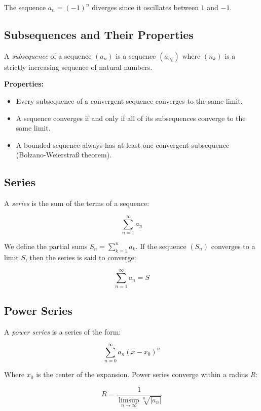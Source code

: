 The sequence \(a_n = {(-1)}^n\) diverges since it oscillates between \(1\) and \(-1\).

\subsection{Subsequences and Their Properties}

A \emph{subsequence} of a sequence \((a_n)\) is a sequence \((a_{n_k})\) where \((n_k)\) is a strictly 
increasing sequence of natural numbers.

\textbf{Properties:}

\begin{itemize}

    \item Every subsequence of a convergent sequence converges to the same limit.

    \item A sequence converges if and only if all of its subsequences converge to the same limit.

    \item A bounded sequence always has at least one convergent subsequence (Bolzano-Weierstraß theorem).

\end{itemize}

\subsection{Series}

A \emph{series} is the sum of the terms of a sequence:

\[
    \sum_{n=1}^{\infty} a_n
\]

We define the partial sums \(S_n = \sum_{k=1}^n a_k\). If the sequence \((S_n)\) converges to a limit \(S\), then the series is said to converge:

\[
    \sum_{n=1}^{\infty} a_n = S
\]

\subsection{Power Series}

A \emph{power series} is a series of the form:

\[
    \sum_{n=0}^{\infty} a_n {(x - x_0)}^n
\]

Where \(x_0\) is the center of the expansion. Power series converge within a radius \emph{R}:

\[
    R = \frac{1}{\limsup\limits_{n \to \infty} \sqrt[n]{|a_n|}}
\]


